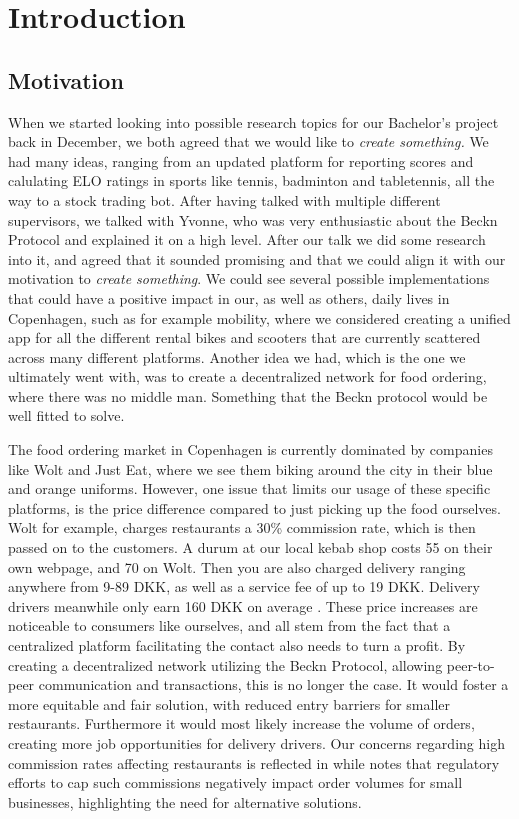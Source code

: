 \newpage
\newpage
\section{Introduction}
\label{introduction}
\subsection{Motivation}
\label{motivation}
When we started looking into possible research topics for our Bachelor's project back in December, we both agreed that we would like to \emph{create something.} We had many ideas, ranging from an updated platform for reporting scores and calulating ELO ratings in sports like tennis, badminton and tabletennis, all the way to a stock trading bot. After having talked with multiple different supervisors, we talked with Yvonne, who was very enthusiastic about the Beckn Protocol and explained it on a high level. After our talk we did some research into it, and agreed that it sounded promising and that we could align it with our motivation to \emph{create something}. We could see several possible implementations that could have a positive impact in our, as well as others, daily lives in Copenhagen, such as for example mobility, where we considered creating a unified app for all the different rental bikes and scooters that are currently scattered across many different platforms. Another idea we had, which is the one we ultimately went with, was to create a decentralized network for food ordering, where there was no middle man. Something that the Beckn protocol would be well fitted to solve.

The food ordering market in Copenhagen is currently dominated by companies like Wolt and Just Eat, where we see them biking around the city in their blue and orange uniforms. However, one issue that limits our usage of these specific platforms, is the price difference compared to just picking up the food ourselves. Wolt for example, charges restaurants a 30\% commission rate, which is then passed on to the customers. A durum at our local kebab shop costs 55 on their own webpage, and 70 on Wolt. Then you are also charged delivery ranging anywhere from 9-89 DKK, as well as a service fee of up to 19 DKK. Delivery drivers meanwhile only earn 160 DKK on average \citep{wolt_faqs}. These price increases are noticeable to consumers like ourselves, and all stem from the fact that a centralized platform facilitating the contact also needs to turn a profit. By creating a decentralized network utilizing the Beckn Protocol, allowing peer-to-peer communication and transactions, this is no longer the case. It would foster a more equitable and fair solution, with reduced entry barriers for smaller restaurants. Furthermore it would most likely increase the volume of orders, creating more job opportunities for delivery drivers. Our concerns regarding high commission rates affecting restaurants is reflected in \citet{seghezzi_mangiaracina_2021} while \citet{li_wang_2024} notes that regulatory efforts to cap such commissions negatively impact order volumes for small businesses, highlighting the need for alternative solutions.

